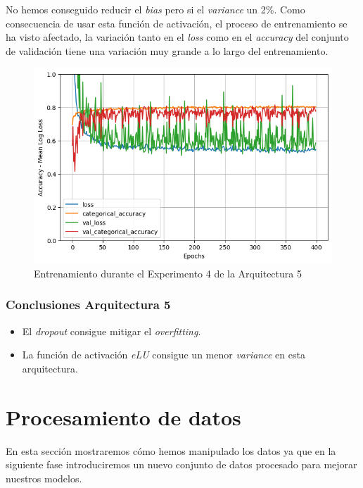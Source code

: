 \documentclass{article}
\begin{document}
		    No hemos conseguido reducir el \textit{bias} pero si el \textit{variance} un 2\%. Como consecuencia de usar esta funci\'on de activaci\'on, el proceso de entrenamiento se ha visto afectado, la variaci\'on tanto en el \textit{loss} como en el \textit{accuracy} del conjunto de validaci\'on tiene una variaci\'on muy grande a lo largo del entrenamiento.
			\begin{figure}[!h]
				\begin{center}
					\includegraphics[scale=0.5]{d-tr-a5-e4.png}		
					\caption{Entrenamiento durante el Experimento 4 de la Arquitectura 5}	
					\label{d-tr-a5-e4}
				\end{center}
			\end{figure}
		
		
		\subsubsection{Conclusiones Arquitectura 5}
		\label{d-cl-a5}
			\begin{itemize}
				\item El \textit{dropout} consigue mitigar el \textit{overfitting}.
				\item La funci\'on de activaci\'on \textit{eLU} consigue un menor \textit{variance} en esta arquitectura.
			\end{itemize}
			
	\section{Procesamiento de datos}
	\label{d-s-dp}
		En esta secci\'on mostraremos c\'omo hemos manipulado los datos ya que en la siguiente fase introduciremos un nuevo conjunto de datos procesado para mejorar nuestros modelos.
		
\end{document}
